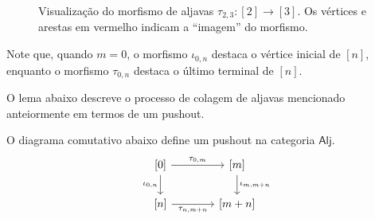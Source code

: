 \begin{figure}[h]
    \centering
    \caption{Visualização do morfismo de aljavas $\tau_{2,3}: [2] \to [3]$. Os vértices e arestas em vermelho indicam a ``imagem'' do morfismo.}
    \label{fig:morfismo_aljavas_segmento_terminal}
\end{figure}

Note que, quando $m=0$, o morfismo $\iota_{0,n}$ destaca o vértice inicial de $[n]$, enquanto o morfismo $\tau_{0,n}$ destaca o último terminal de $[n]$.

O lema abaixo descreve o processo de colagem de aljavas mencionado anteiormente em termos de um pushout.

\begin{lema}\label{lema:pushout_aljavas_ordinais}
    O diagrama comutativo abaixo define um pushout na categoria $\mathsf{Alj}$.
    \begin{equation}\label{eq:pushout_aljavas_ordinais_diag}
        \begin{tikzcd}[column sep=1.35cm]
            {[0]}
            \arrow[r,"{\tau_{0,m}}"]
            \arrow[d, "{\iota_{0,n}}" swap]
            & {[m]}
            \arrow[d, "{\iota_{m,m+n}}"]
            \\ {[n]}
            \arrow[r, "{\tau_{n,m+n}}" swap]
            & {[m+n]}
        \end{tikzcd}
    \end{equation}
\end{lema}

